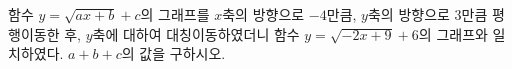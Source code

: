 \hspace*{2mm}\begin{minipage}[t]{\dimexpr\linewidth-2mm\relax}\vspace{0pt}
함수 $y=\sqrt{ax+b}+c$의 그래프를 $x$축의 방향으로 $-4$만큼, $y$축의 방향으로 $3$만큼 평행이동한 후, $y$축에 대하여 대칭이동하였더니 함수 $y=\sqrt{-2x+9}+6$의 그래프와 일치하였다. $a+b+c$의 값을 구하시오. \end{minipage}
